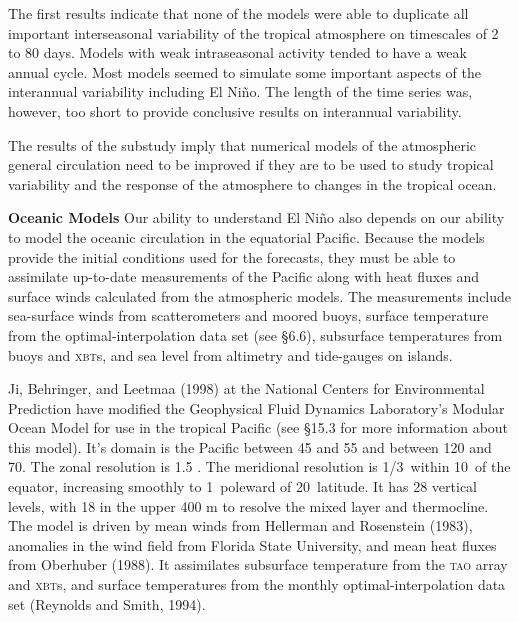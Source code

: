 The first results indicate that none of the models were able to
duplicate all important interseasonal variability of the tropical
atmosphere on timescales of 2 to 80 days. Models with weak
intraseasonal activity tended to have a weak annual cycle. Most models
seemed to simulate some important aspects of the interannual
variability including El Ni\~{n}o. The length of the time series was,
however, too short to provide conclusive results on interannual
variability.

The results of the substudy imply that numerical models of the
atmospheric general circulation need to be improved if they are to be
used to study tropical variability and the response of the atmosphere
to changes in the tropical ocean.

\textbf{Oceanic Models} Our ability to understand El Ni\~{n}o also
depends on our ability to model the oceanic circulation in the
equatorial Pacific. Because the models provide the initial conditions
used for the forecasts, they must be able to assimilate up-to-date
measurements of the Pacific along with heat fluxes
and surface winds calculated from the atmospheric models. The
measurements include sea-surface winds from
scatterometers
and moored buoys, surface temperature from the optimal-interpolation
data set (see \S6.6), subsurface temperatures from buoys and
\textsc{xbt}s, and sea level from altimetry and tide-gauges on
islands.

Ji, Behringer, and Leetmaa (1998) at the National Centers for
Environmental Prediction have modified the Geophysical Fluid Dynamics
Laboratory's Modular Ocean Model for use in the tropical Pacific (see
\S15.3 for more information about this model). It's domain is the
Pacific between 45 and 55 and between
120 and 70. The zonal resolution is 1.5\degrees
. The meridional resolution is {\footnotesize 1/3}\degrees\ within
10\degrees\ of the equator, increasing smoothly to 1\degrees\ poleward
of 20\degrees\ latitude. It has 28 vertical levels, with 18 in the
upper 400 m to resolve the mixed layer and thermocline. The
model is driven by mean winds from Hellerman and Rosenstein (1983),
anomalies in the wind field from Florida State
University, and mean heat fluxes from
Oberhuber (1988). It assimilates subsurface temperature from the
\textsc{tao} array and \textsc{xbt}s, and surface temperatures from
the monthly optimal-interpolation data set (Reynolds and Smith, 1994).

